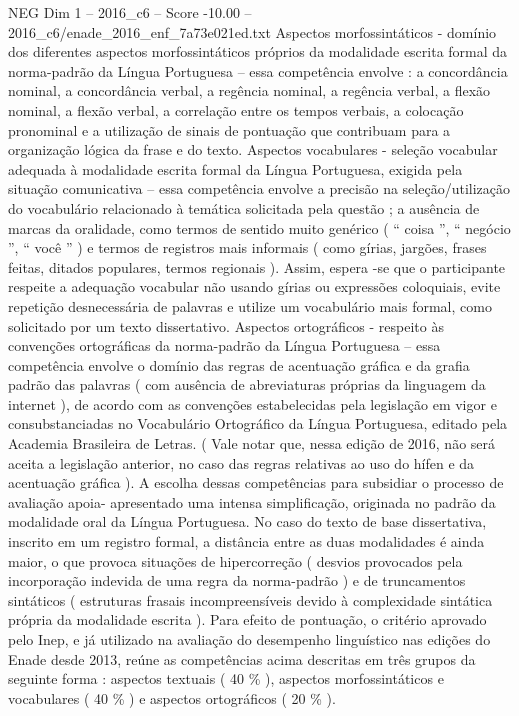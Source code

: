 \begin{textsample}{NEG Dim 1 – 2016\_c6 – Score -10.00 – 2016\_c6/enade\_2016\_enf\_7a73e021ed.txt}
Aspectos morfossintáticos - domínio dos diferentes aspectos morfossintáticos próprios da modalidade escrita formal da norma-padrão da Língua Portuguesa – essa competência envolve : a concordância nominal, a concordância verbal, a regência nominal, a regência verbal, a flexão nominal, a flexão verbal, a correlação entre os tempos verbais, a colocação pronominal e a utilização de sinais de pontuação que contribuam para a organização lógica da frase e do texto.
Aspectos vocabulares - seleção vocabular adequada à modalidade escrita formal da Língua Portuguesa, exigida pela situação comunicativa – essa competência envolve a precisão na seleção/utilização do vocabulário relacionado à temática solicitada pela questão ; a ausência de marcas da oralidade, como termos de sentido muito genérico ( “ coisa ”, “ negócio ”, “ você ” ) e termos de registros mais informais ( como gírias, jargões, frases feitas, ditados populares, termos regionais ).
Assim, espera -se que o participante respeite a adequação vocabular não usando gírias ou expressões coloquiais, evite repetição desnecessária de palavras e utilize um vocabulário mais formal, como solicitado por um texto dissertativo.
Aspectos ortográficos - respeito às convenções ortográficas da norma-padrão da Língua Portuguesa – essa competência envolve o domínio das regras de acentuação gráfica e da grafia padrão das palavras ( com ausência de abreviaturas próprias da linguagem da internet ), de acordo com as convenções estabelecidas pela legislação em vigor e consubstanciadas no Vocabulário Ortográfico da Língua Portuguesa, editado pela Academia Brasileira de Letras. ( Vale notar que, nessa edição de 2016, não será aceita a legislação anterior, no caso das regras relativas ao uso do hífen e da acentuação gráfica ).
A escolha dessas competências para subsidiar o processo de avaliação apoia- apresentado uma intensa simplificação, originada no padrão da modalidade oral da Língua Portuguesa.
No caso do texto de base dissertativa, inscrito em um registro formal, a distância entre as duas modalidades é ainda maior, o que provoca situações de hipercorreção ( desvios provocados pela incorporação indevida de uma regra da norma-padrão ) e de truncamentos sintáticos ( estruturas frasais incompreensíveis devido à complexidade sintática própria da modalidade escrita ).
Para efeito de pontuação, o critério aprovado pelo Inep, e já utilizado na avaliação do desempenho linguístico nas edições do Enade desde 2013, reúne as competências acima descritas em três grupos da seguinte forma : aspectos textuais ( 40 \% ), aspectos morfossintáticos e vocabulares ( 40 \% ) e aspectos ortográficos ( 20 \% ).

\end{textsample}
